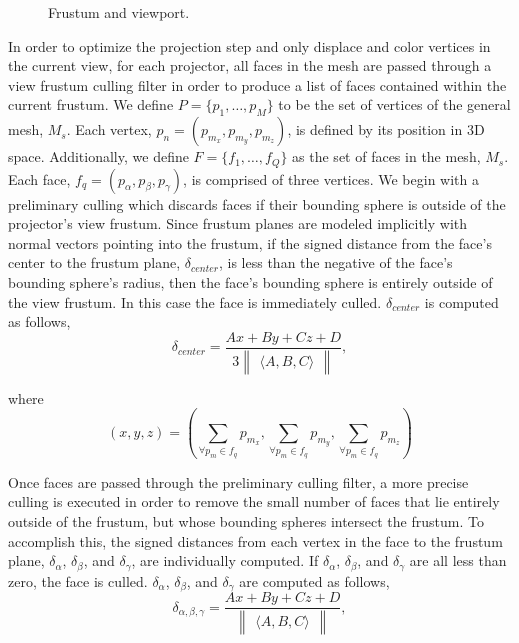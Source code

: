 \documentclass[a4paper,twoside]{article}
\begin{document}
\begin{figure}[!h]
   \vspace{-0.2cm}
   \caption{Frustum and viewport.}
  \label{fig:frustum}
 \end{figure}

In order to optimize the projection step and only displace and color vertices in the current view, for each projector, all faces in the mesh are passed through a view frustum culling filter in order to produce a list of faces contained within the current frustum. We define $P = \{p_{1},\dots,p_{M}\}$ to be the set of vertices of the general mesh, $M_s$. Each vertex, $p_{n} =  (p_{m_{x}},p_{m_{y}},p_{m_{z}})$, is defined by its position in 3D space. Additionally, we define $F = \{f_{1},\dots,f_{Q}\}$ as the set of faces in the mesh, $M_s$. Each face, $f_{q} = (p_{\alpha}, p_{\beta}, p_{\gamma})$, is comprised of three vertices. We begin with a preliminary culling which discards faces if their bounding sphere is outside of the projector's view frustum. Since frustum planes are modeled implicitly with normal vectors pointing into the frustum, if the signed distance from the face's center to the frustum plane, $\delta_{center}$, is less than the negative of the face's bounding sphere's radius, then the face's bounding sphere is entirely outside of the view frustum. In this case the face is immediately culled. $\delta_{center}$ is computed as follows,
%
\begin{equation}
\delta_{center} = \frac{Ax + By + Cz + D}{3 \begin{Vmatrix} \langle A, B, C \rangle \end{Vmatrix}},
\end{equation}

where
\begin{equation}
(x, y, z) = \left(\sum\limits_{\forall p_{m} \in f_{q}} p_{m_{x}}, \sum\limits_{\forall p_{m} \in f_{q}} p_{m_{y}}, \sum\limits_{\forall p_{m} \in f_{q}} p_{m_{z}}\right)
\end{equation}

Once faces are passed through the preliminary culling filter, a more precise culling is executed in order to remove the small number of faces that lie entirely outside of the frustum, but whose bounding spheres intersect the frustum.  To accomplish this, the signed distances from each vertex in the face to the frustum plane, $\delta_{\alpha}$, $\delta_{\beta}$, and $\delta_{\gamma}$, are individually computed. If $\delta_{\alpha}$, $\delta_{\beta}$, and $\delta_{\gamma}$ are all less than zero, the face is culled. $\delta_{\alpha}$, $\delta_{\beta}$, and $\delta_{\gamma}$ are computed as follows,
\begin{equation} %
\delta_{\alpha, \beta, \gamma} = \frac{Ax + By + Cz + D}{\begin{Vmatrix} \langle A, B, C \rangle \end{Vmatrix}},
\end{equation}
\end{document}
